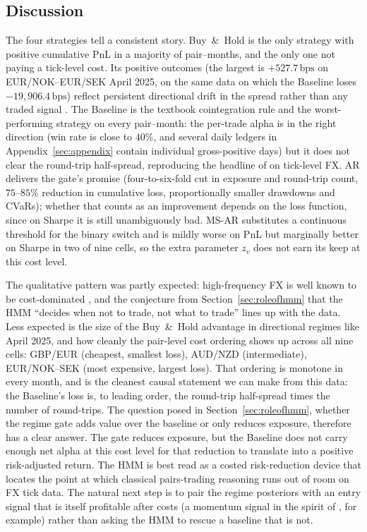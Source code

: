 \subsection{Discussion}\label{sec:result-discussion}

The four strategies tell a consistent story. Buy~\&~Hold is the only strategy with positive cumulative PnL in a majority of pair--months, and the only one not paying a tick-level cost. Its positive outcomes (the largest is $+527.7\,\text{bps}$ on EUR/NOK--EUR/SEK April 2025, on the same data on which the Baseline loses $-19{,}906.4\,\text{bps}$) reflect persistent directional drift in the spread rather than any traded signal \parencite{gatev2006pairs}. The Baseline is the textbook cointegration rule and the worst-performing strategy on every pair--month: the per-trade alpha is in the right direction (win rate is close to $40\%$, and several daily ledgers in Appendix~\ref{sec:appendix} contain individual gross-positive days) but it does not clear the round-trip half-spread, reproducing the headline of \textcite{krauss2017statarb} on tick-level FX. AR delivers the gate's promise (four-to-six-fold cut in exposure and round-trip count, $75$--$85\%$ reduction in cumulative loss, proportionally smaller drawdowns and CVaRs); whether that counts as an improvement depends on the loss function, since on Sharpe it is still unambiguously bad. MS-AR substitutes a continuous threshold for the binary switch and is mildly worse on PnL but marginally better on Sharpe in two of nine cells, so the extra parameter $z_v$ does not earn its keep at this cost level.

The qualitative pattern was partly expected: high-frequency FX is well known to be cost-dominated \parencite{krauss2017statarb}, and the conjecture from Section~\ref{sec:roleofhmm} that the HMM ``decides when not to trade, not what to trade'' lines up with the data. Less expected is the size of the Buy~\&~Hold advantage in directional regimes like April 2025, and how cleanly the pair-level cost ordering shows up across all nine cells: GBP/EUR (cheapest, smallest loss), AUD/NZD (intermediate), EUR/NOK--SEK (most expensive, largest loss). That ordering is monotone in every month, and is the cleanest causal statement we can make from this data: the Baseline's loss is, to leading order, the round-trip half-spread times the number of round-trips. The question posed in Section~\ref{sec:roleofhmm}, whether the regime gate adds value over the baseline or only reduces exposure, therefore has a clear answer. The gate reduces exposure, but the Baseline does not carry enough net alpha at this cost level for that reduction to translate into a positive risk-adjusted return. The HMM is best read as a costed risk-reduction device that locates the point at which classical pairs-trading reasoning runs out of room on FX tick data. The natural next step is to pair the regime posteriors with an entry signal that is itself profitable after costs (a momentum signal in the spirit of \textcite{jegadeeshtitman1993}, for example) rather than asking the HMM to rescue a baseline that is not.
